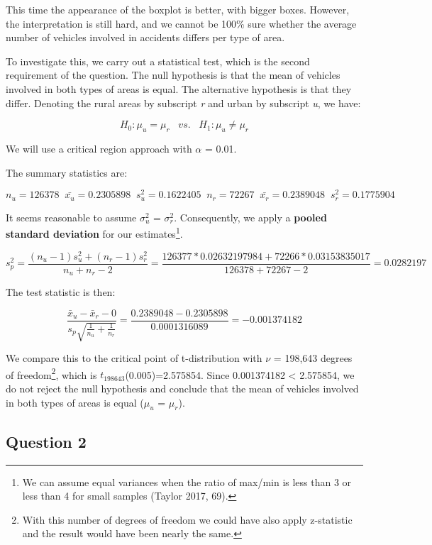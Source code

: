 \documentclass[]{article}
\let\rmarkdownfootnote\footnote%
\def\footnote{\protect\rmarkdownfootnote}
\begin{document}
This time the appearance of the boxplot is better, with bigger boxes.
However, the interpretation is still hard, and we cannot be 100\% sure
whether the average number of vehicles involved in accidents differs per
type of area.

To investigate this, we carry out a statistical test, which is the
second requirement of the question. The null hypothesis is that the mean
of vehicles involved in both types of areas is equal. The alternative
hypothesis is that they differ. Denoting the rural areas by subscript
\emph{r} and urban by subscript \emph{u}, we have:

\[H_{0}: \mu_{u} = \mu_{r}\;\;\;vs.\;\;\;H_{1}: \mu_{u} \neq \mu_{r}\]

We will use a critical region approach with \(\alpha\) = 0.01.

The summary statistics are:

\[n_{u}=126378\;\;\bar{x_{u}}=0.2305898\;\;s_{u}^{2}=0.1622405\;\;n_{r}=72267\;\;\bar{x_{r}}=0.2389048\;\;s_{r}^{2}=0.1775904\]

It seems reasonable to assume \(\sigma_{u}^{2}\) = \(\sigma_{r}^{2}\).
Consequently, we apply a \textbf{pooled standard deviation} for our
estimates\footnote{We can assume equal variances when the ratio of
  max/min is less than 3 or less than 4 for small samples (Taylor 2017,
  69).}.

\[s_{p}^{2}=\frac{(n_{u}-1)s_{u}^{2}+(n_{r}-1)s_{r}^{2}}{n_{u}+n_{r}-2} = \frac{126377*0.02632197984+72266*0.03153835017}{126378+72267-2}=0.0282197\]

The test statistic is then:

\[\frac{\bar x_{u}-\bar x_{r}-0}{s_{p}\sqrt{\frac{1}{n_{u}}+\frac{1}{n_{r}}}}=\frac{0.2389048-0.2305898}{0.0001316089}=-0.001374182\]

We compare this to the critical point of t-distribution with \(\nu\) =
198,643 degrees of freedom\footnote{With this number of degrees of
  freedom we could have also apply z-statistic and the result would have
  been nearly the same.}, which is \(t_{198643}\)(0.005)=2.575854. Since
\textbar{}0.001374182\textbar{} \textless{} 2.575854, we do not reject
the null hypothesis and conclude that the mean of vehicles involved in
both types of areas is equal (\(\mu_{u}\) = \(\mu_{r}\)).

\subsection{Question 2}\label{question-2}
\end{document}
